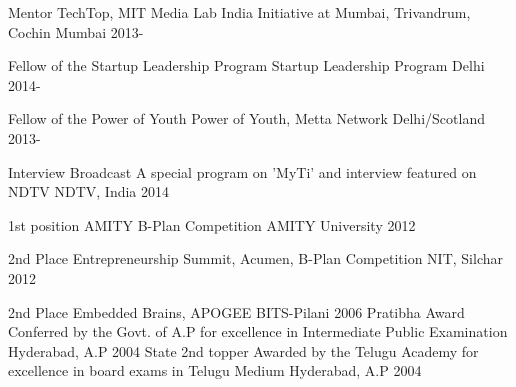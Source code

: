 



\begin{cvhonors}


    \cvhonor
    {Mentor} %
    {TechTop, MIT Media Lab India Initiative at Mumbai, Trivandrum, Cochin} %
    {Mumbai} %
    {2013-} %
    
  \cvhonor
    {Fellow of the Startup Leadership Program} %
    {Startup Leadership Program} %
    {Delhi} %
    {2014-} %

  \cvhonor
    {Fellow of the Power of Youth} %
    {Power of Youth, Metta Network} %
    {Delhi/Scotland} %
    {2013-} %




  \cvhonor
    {Interview Broadcast} %
    {A special program on 'MyTi' and interview featured on NDTV} %
    {NDTV, India} %
    {2014} %

  \cvhonor
    {1st position} %
    {AMITY B-Plan Competition} %
    {AMITY University} %
    {2012} %

  \cvhonor
    {2nd Place} %
    {Entrepreneurship Summit, Acumen, B-Plan Competition} %
    {NIT, Silchar} %
    {2012} %


  \cvhonor
    {2nd Place} %
    {Embedded Brains, APOGEE} %
    {BITS-Pilani} %
    {2006} %
  \cvhonor
    {Pratibha Award} %
    {Conferred by the Govt. of A.P for excellence in Intermediate Public Examination} %
    {Hyderabad, A.P} %
    {2004} %
  \cvhonor
    {State 2nd topper} %
    {Awarded by the Telugu Academy for excellence in board exams in Telugu Medium} %
    {Hyderabad, A.P} %
    {2004} %

\end{cvhonors}
